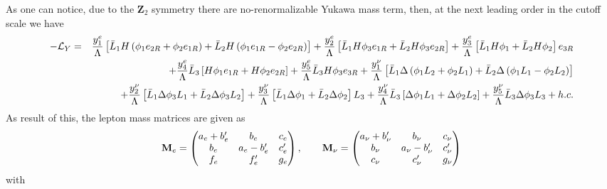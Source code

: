 \documentclass[aps,prd,groupaddress,floatfix,tighten,nofootinbib,showpacs,amsfonts,superscriptaddress]{revtex4-2}
\begin{document}
As one can notice, due to the $\mathbf{Z}_{2}$ symmetry there are no-renormalizable Yukawa mass term, then, at the next leading order in the cutoff scale we have
\begin{eqnarray}
-\mathcal{L}_{Y}&=&
\frac{y_{1}^{e}}{\Lambda}\left[ \bar{L}_{1}H\left(
\phi_{1}e_{2R}+\phi_{2}e_{1R}\right) +\bar{L}_{2}H\left(
\phi_{1}e_{1R}-\phi_{2}e_{2R}\right) \right] +\frac{y_{2}^{e}}{\Lambda}\left[ \bar{L}%
_{1}H \phi_{3}e_{1R}+\bar{L}_{2}H\phi_{3}e_{2R}\right] +\frac{y_{3}^{e}}{\Lambda}\left[ \bar{L}%
_{1}H \phi_{1}+\bar{L}_{2}H \phi_{2}\right]e_{3R} \notag \\
&&+\frac{y_{4}^{e}}{\Lambda}\bar{L}_{3}\left[ H \phi_{1}e_{1R}+H \phi_{2}e_{2R}\right] +\frac{y_{5}^{e}}{\Lambda}\bar{L}_{3}H \phi_{3}e_{3R}
+\frac{y_{1}^{\nu}}{\Lambda}\left[ \bar{L}_{1}\Delta\left(
\phi_{1}L_{2}+\phi_{2}L_{1}\right) +\bar{L}_{2}\Delta\left(
\phi_{1}L_{1}-\phi_{2}L_{2}\right) \right]
\notag \\&&+
\frac{y_{2}^{\nu}}{\Lambda}\left[ \bar{L}%
_{1}\Delta \phi_{3}L_{1}+\bar{L}_{2}\Delta\phi_{3}L_{2}\right] +\frac{y_{3}^{\nu}}{\Lambda}\left[ \bar{L}%
_{1}\Delta \phi_{1}+\bar{L}_{2}\Delta \phi_{2}\right] L_{3}+\frac{y_{4}^{\nu}}{\Lambda}\bar{L}_{3}\left[ \Delta \phi_{1}L_{1}+\Delta \phi_{2}L_{2}\right] +\frac{y_{5}^{\nu}}{\Lambda}\bar{L}_{3}\Delta \phi_{3} L_{3}
+h.c.
\end{eqnarray}
As result of this, the lepton mass matrices are given as
\begin{equation}
{\bf M}_{e}=\begin{pmatrix}
a_{e}+b^{\prime}_{e} & b_{e} & c_{e} \\ 
b_{e} & a_{e}-b^{\prime}_{e} & c^{\prime}_{e} \\ 
f_{e} & f^{\prime}_{e} & g_{e}
\end{pmatrix},\qquad {\bf M}_{\nu}=\begin{pmatrix}
a_{\nu}+b^{\prime}_{\nu} & b_{\nu} & c_{\nu} \\ 
b_{\nu} & a_{\nu}-b^{\prime}_{\nu} & c^{\prime}_{\nu} \\ 
c_{\nu} & c^{\prime}_{\nu} & g_{\nu}
\end{pmatrix}
\end{equation}
with 
\end{document}
